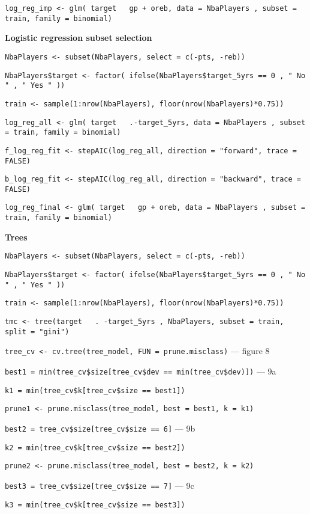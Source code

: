 \texttt{log\_reg\_imp <- glm( target ~ gp + oreb, data = NbaPlayers , subset = train, family = binomial)}

\noindent
\textbf{Logistic regression subset selection}

\texttt{NbaPlayers <- subset(NbaPlayers, select = c(-pts, -reb))}

\texttt{NbaPlayers\$target <- factor( ifelse(NbaPlayers\$target\_5yrs == 0 , " No " , " Yes " ))}

\texttt{train <- sample(1:nrow(NbaPlayers), floor(nrow(NbaPlayers)*0.75))}

\texttt{log\_reg\_all <- glm( target ~ .-target\_5yrs, data = NbaPlayers , subset = train, family = binomial)}

\texttt{f\_log\_reg\_fit <- stepAIC(log\_reg\_all, direction = "forward", trace = FALSE)}

\texttt{b\_log\_reg\_fit <- stepAIC(log\_reg\_all, direction = "backward", trace = FALSE)}

\texttt{log\_reg\_final <- glm( target ~ gp + oreb, data = NbaPlayers , subset = train, family = binomial)}

\noindent
\textbf{Trees}

\texttt{NbaPlayers <- subset(NbaPlayers, select = c(-pts, -reb))}

\texttt{NbaPlayers\$target <- factor( ifelse(NbaPlayers\$target\_5yrs == 0 , " No " , " Yes " ))}

\texttt{train <- sample(1:nrow(NbaPlayers), floor(nrow(NbaPlayers)*0.75))}

\texttt{tmc <- tree(target ~ . -target\_5yrs , NbaPlayers, subset = train, split = "gini")}

\texttt{tree\_cv <- cv.tree(tree\_model, FUN = prune.misclass)} --- figure 8

\texttt{best1 = min(tree\_cv\$size[tree\_cv\$dev == min(tree\_cv\$dev)])} --- 9a

\texttt{k1 = min(tree\_cv\$k[tree\_cv\$size == best1])}

\texttt{prune1 <- prune.misclass(tree\_model, best = best1, k = k1)}

\texttt{best2 = tree\_cv\$size[tree\_cv\$size == 6]} --- 9b

\texttt{k2 = min(tree\_cv\$k[tree\_cv\$size == best2])}

\texttt{prune2 <- prune.misclass(tree\_model, best = best2, k = k2)}

\texttt{best3 = tree\_cv\$size[tree\_cv\$size == 7]} --- 9c

\texttt{k3 = min(tree\_cv\$k[tree\_cv\$size == best3])}

